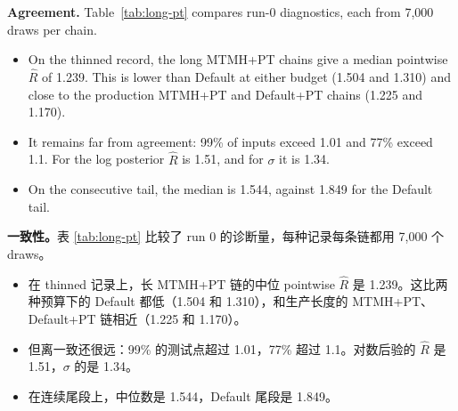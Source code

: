 \documentclass[11pt]{article}
\newcommand{\Rhat}{\hat R}
\begin{document}
\textbf{Agreement.} Table~\ref{tab:long-pt} compares run-0 diagnostics, each from 7,000 draws per chain.
\begin{itemize}
\item On the thinned record, the long MTMH+PT chains give a median pointwise $\Rhat$ of 1.239. This is lower than Default at either budget (1.504 and 1.310) and close to the production MTMH+PT and Default+PT chains (1.225 and 1.170).
\item It remains far from agreement: 99\% of inputs exceed 1.01 and 77\% exceed 1.1. For the log posterior $\Rhat$ is 1.51, and for $\sigma$ it is 1.34.
\item On the consecutive tail, the median is 1.544, against 1.849 for the Default tail.
\end{itemize}

\begin{zhbox}
\textbf{一致性。}表 \ref{tab:long-pt} 比较了 run 0 的诊断量，每种记录每条链都用 7,000 个 draws。
\begin{itemize}
\item 在 thinned 记录上，长 MTMH+PT 链的中位 pointwise $\Rhat$ 是 1.239。这比两种预算下的 Default 都低（1.504 和 1.310），和生产长度的 MTMH+PT、Default+PT 链相近（1.225 和 1.170）。
\item 但离一致还很远：99\% 的测试点超过 1.01，77\% 超过 1.1。对数后验的 $\Rhat$ 是 1.51，$\sigma$ 的是 1.34。
\item 在连续尾段上，中位数是 1.544，Default 尾段是 1.849。
\end{itemize}
\end{zhbox}
\end{document}
